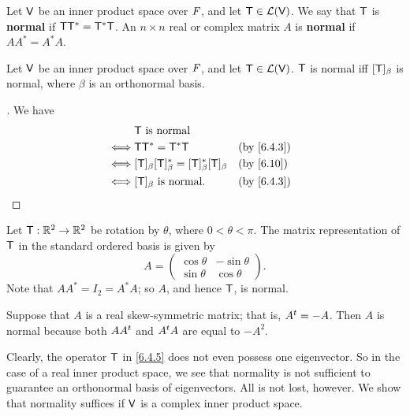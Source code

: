 \begin{defn}\label{6.4.3}
  Let \(\mathsf{V}\) be an inner product space over \(\mathit{F}\), and let \(\mathsf{T} \in \mathcal{L}(\mathsf{V})\).
  We say that \(\mathsf{T}\) is \textbf{normal} if \(\mathsf{T} \mathsf{T}^* = \mathsf{T}^* \mathsf{T}\).
  An \(n \times n\) real or complex matrix \(A\) is \textbf{normal} if \(A A^* = A^* A\).
\end{defn}

\begin{cor}\label{6.4.4}
  Let \(\mathsf{V}\) be an inner product space over \(\mathit{F}\), and let \(\mathsf{T} \in \mathcal{L}(\mathsf{V})\).
  \(\mathsf{T}\) is normal iff \([\mathsf{T}]_{\beta}\) is normal, where \(\beta\) is an orthonormal basis.
\end{cor}

\begin{proof}[]
  We have
  \begin{align*}
         & \T \text{ is normal}                                                                    \\
    \iff & \T \T^* = \T^* \T                                         &  & \text{(by \cref{6.4.3})} \\
    \iff & [\T]_{\beta} [\T]_{\beta}^* = [\T]_{\beta}^* [\T]_{\beta} &  & \text{(by \cref{6.10})}  \\
    \iff & [\T]_{\beta} \text{ is normal}.                           &  & \text{(by \cref{6.4.3})}
  \end{align*}
\end{proof}

\begin{eg}\label{6.4.5}
  Let \(\mathsf{T} : \mathbb{R}^2 \to \mathbb{R}^2\) be rotation by \(\theta\), where \(0 < \theta < \pi\).
  The matrix representation of \(\mathsf{T}\) in the standard ordered basis is given by
  \[
    A = \begin{pmatrix}
      \cos\theta & -\sin\theta \\
      \sin\theta & \cos\theta
    \end{pmatrix}.
  \]
  Note that \(A A^* = I_2 = A^* A\);
  so \(A\), and hence \(\mathsf{T}\), is normal.
\end{eg}

\begin{eg}\label{6.4.6}
  Suppose that \(A\) is a real skew-symmetric matrix;
  that is, \({A}^{t} = -A\).
  Then \(A\) is normal because both \(A {A}^{t}\) and \({A}^{t} A\) are equal to \(-A^2\).
\end{eg}

\begin{note}
  Clearly, the operator \(\mathsf{T}\) in \cref{6.4.5} does not even possess one eigenvector.
  So in the case of a real inner product space, we see that normality is not sufficient to guarantee an orthonormal basis of eigenvectors.
  All is not lost, however.
  We show that normality suffices if \(\mathsf{V}\) is a complex inner product space.
\end{note}

